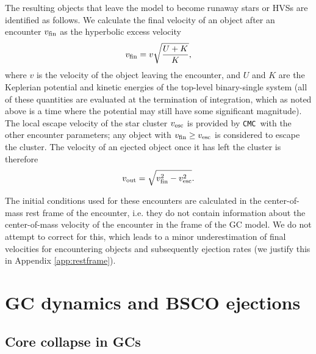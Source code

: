 \documentclass[twocolumn]{aastex631}
\newcommand{\CMC}{\texttt{CMC}}
\begin{document}
The resulting objects that leave the model to become runaway stars or HVSs are identified as follows.
We calculate the final velocity of an object after an encounter $v_{\rm fin}$ as the hyperbolic excess velocity
\begin{equation}
    v_{\rm fin} = v \sqrt{\frac{U + K}{K}},
\end{equation}
\noindent where $v$ is the velocity of the object leaving the encounter, and $U$ and $K$ are the Keplerian potential and kinetic energies of the top-level binary-single system (all of these quantities are evaluated at the termination of integration, which as noted above is a time where the potential may still have some significant magnitude).
The local escape velocity of the star cluster $v_{\rm esc}$ is provided by \CMC\ with the other encounter parameters; any object with $v_{\rm fin} \ge v_{\rm esc}$ is considered to escape the cluster.
The velocity of an ejected object once it has left the cluster is therefore
\begin{equation}
    v_{\rm out} = \sqrt{v_{\rm fin}^2 - v_{\rm esc}^2}.
\end{equation}

The initial conditions used for these encounters are calculated in the center-of-mass rest frame of the encounter, i.e. they do not contain information about the center-of-mass velocity of the encounter in the frame of the GC model.
We do not attempt to correct for this, which leads to a minor underestimation of final velocities for encountering objects and subsequently ejection rates (we justify this in Appendix \ref{app:restframe}).

\section{GC dynamics and BSCO ejections} \label{sec:gcdyns}

\subsection{Core collapse in GCs} \label{subsec:cc}
\end{document}
